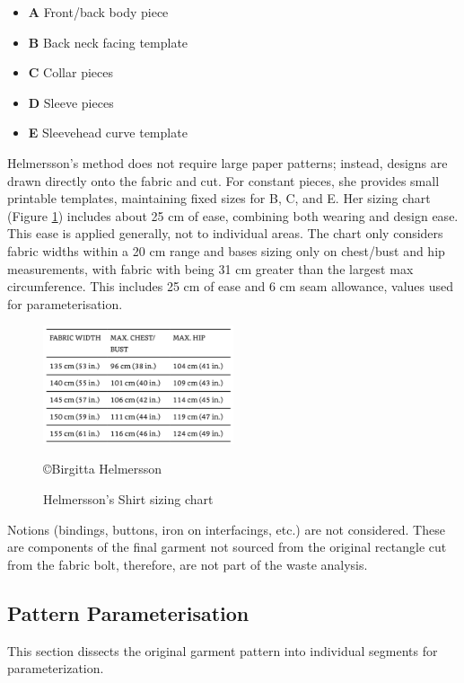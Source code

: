 \begin{itemize}
    \item \textbf{A} Front/back body piece
    \item \textbf{B} Back neck facing template
    \item \textbf{C} Collar pieces
    \item \textbf{D} Sleeve pieces
    \item \textbf{E} Sleevehead curve template
\end{itemize}
Helmersson's method does not require large paper patterns; instead, designs are drawn directly onto the fabric and cut. For constant pieces, she provides small printable templates, maintaining fixed sizes for B, C, and E. Her sizing chart (Figure \ref{fig:bh size chart}) includes about 25 cm of ease, combining both wearing and design ease. This ease is applied generally, not to individual areas. The chart only considers fabric widths within a 20 cm range and bases sizing only on chest/bust and hip measurements, with fabric with being 31 cm greater than the largest max circumference. This includes 25 cm of ease and 6 cm seam allowance, values used for parameterisation.
\begin{figure} [H]
    \centering
    \includegraphics[width = 0.5\textwidth]{Images/BH size chart.png} 
    \caption{Helmersson's Shirt sizing chart}
    \copyright {Birgitta Helmersson}
    \label{fig:bh size chart}
\end{figure}
Notions (bindings, buttons, iron on interfacings, etc.) are not considered. These are components of the final garment not sourced from the original rectangle cut from the fabric bolt, therefore, are not part of the waste analysis.


\subsection{Pattern Parameterisation}
This section dissects the original garment pattern into individual segments for parameterization. 

